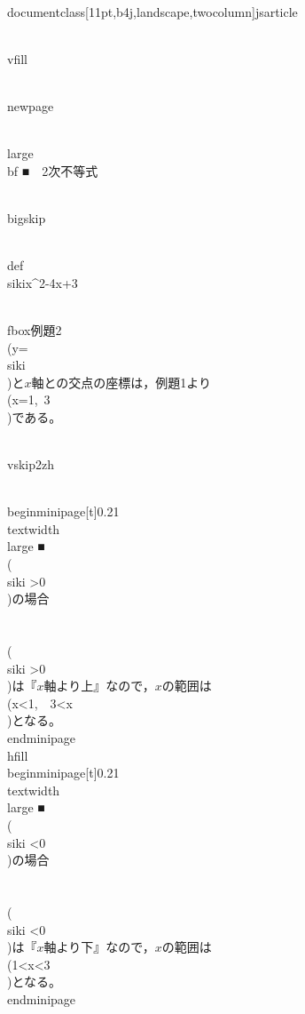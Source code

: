 \\documentclass[11pt,b4j,landscape,twocolumn]{jsarticle}
\begin{document}
\\vfill


\\newpage%

{\\large\\bf ■　2次不等式}

\\bigskip

\\def\\siki{x^2-4x+3}

\\fbox{例題2}
　\\(y=\\siki\\)と$x$軸との交点の座標は，例題1より\\(x=1,~3\\)である。

\\vskip2zh

\\begin{minipage}[t]{0.21\\textwidth}
{\\large ■　\\( \\siki >0\\)の場合}\\\\[1zh]
　\\( \\siki >0\\)は『$x$軸より上』なので，$x$の範囲は\\(x<1,~~3<x\\)となる。
\\end{minipage}
\\hfill
\\begin{minipage}[t]{0.21\\textwidth}
{\\large ■　\\( \\siki <0\\)の場合}\\\\[1zh]
　\\( \\siki <0\\)は『$x$軸より下』なので，$x$の範囲は\\(1<x<3\\)となる。
\\end{minipage}
\end{document}
